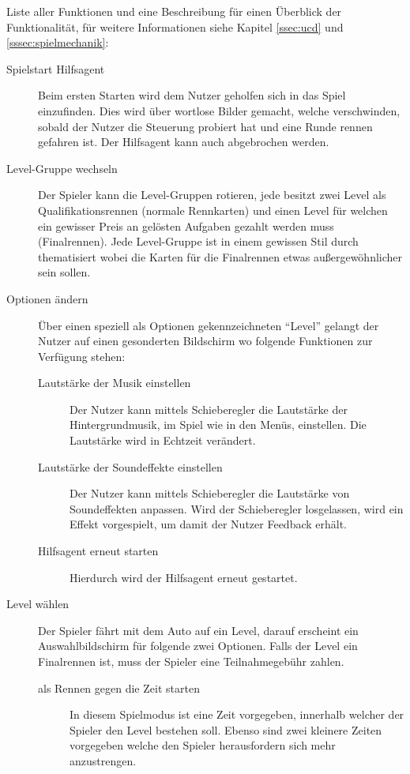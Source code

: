 	Liste aller Funktionen und eine Beschreibung für einen Überblick der Funktionalität, für weitere Informationen siehe Kapitel \ref{ssec:ucd} und \ref{sssec:spielmechanik}:
	\begin{description}
		\item[Spielstart Hilfsagent]{ Beim ersten Starten wird dem Nutzer geholfen sich in das Spiel einzufinden. Dies wird über wortlose Bilder gemacht, welche verschwinden, sobald der Nutzer die Steuerung probiert hat und eine Runde rennen gefahren ist. Der Hilfsagent kann auch abgebrochen werden. }
		\item[Level-Gruppe wechseln]{
			Der Spieler kann die Level-Gruppen rotieren, jede besitzt zwei Level als Qualifikationsrennen (normale Rennkarten) und einen Level für welchen ein gewisser Preis an gelösten Aufgaben gezahlt werden muss (Finalrennen).
			Jede Level-Gruppe ist in einem gewissen Stil durch thematisiert wobei die Karten für die Finalrennen etwas außergewöhnlicher sein sollen.
		}
		\item[Optionen ändern]{ Über einen speziell als Optionen gekennzeichneten \enquote{Level} gelangt der Nutzer auf einen gesonderten Bildschirm wo folgende Funktionen zur Verfügung stehen:
			\begin{description}
				\item[Lautstärke der Musik einstellen]{ Der Nutzer kann mittels Schieberegler die Lautstärke der Hintergrundmusik, im Spiel wie in den Menüs, einstellen. Die Lautstärke wird in Echtzeit verändert. }
				\item[Lautstärke der Soundeffekte einstellen]{ Der Nutzer kann mittels Schieberegler die Lautstärke von Soundeffekten anpassen. Wird der Schieberegler losgelassen, wird ein Effekt vorgespielt, um damit der Nutzer Feedback erhält. }
				\item[Hilfsagent erneut starten]{ Hierdurch wird der Hilfsagent erneut gestartet. }
			\end{description}
		}
		\item[Level wählen]{ Der Spieler fährt mit dem Auto auf ein Level, darauf erscheint ein Auswahlbildschirm für folgende zwei Optionen. Falls der Level ein Finalrennen ist, muss der Spieler eine Teilnahmegebühr zahlen.
			\begin{description}
				\item[als Rennen gegen die Zeit starten]{ In diesem Spielmodus ist eine Zeit vorgegeben, innerhalb welcher der Spieler den Level bestehen soll. Ebenso sind zwei kleinere Zeiten vorgegeben welche den Spieler herausfordern sich mehr anzustrengen. }

\end{description}}
\end{description}

